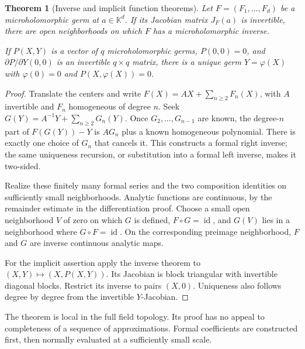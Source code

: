 \documentclass[11pt,letterpaper]{article}
\numberwithin{equation}{section}
\newtheorem{theorem}{Theorem}[section]
\theoremstyle{definition}
\theoremstyle{remark}
\newcommand{\K}{\mathbb K}
\DeclareMathOperator{\id}{id}
\begin{document}
\begin{theorem}[Inverse and implicit function theorems]\label{thm:inverse}
Let $F=(F_1,\ldots,F_d)$ be a microholomorphic germ at $a\in\K^d$.
If its Jacobian matrix $J_F(a)$ is invertible, there are open neighborhoods
on which $F$ has a microholomorphic inverse.

If $P(X,Y)$ is a vector of $q$ microholomorphic germs, $P(0,0)=0$, and
$\partial P/\partial Y(0,0)$ is an invertible $q\times q$ matrix, there
is a unique germ $Y=\varphi(X)$ with $\varphi(0)=0$ and
$P(X,\varphi(X))=0$.
\end{theorem}
\begin{proof}
Translate the centers and write $F(X)=AX+\sum_{n\ge2}F_n(X)$, with
$A$ invertible and $F_n$ homogeneous of degree $n$.
Seek $G(Y)=A^{-1}Y+\sum_{n\ge2}G_n(Y)$. Once $G_2,\ldots,G_{n-1}$
are known, the degree-$n$ part of $F(G(Y))-Y$ is $AG_n$ plus a known
homogeneous polynomial. There is exactly one choice of $G_n$ that cancels
it. This constructs a formal right inverse; the same uniqueness recursion,
or substitution into a formal left inverse, makes it two-sided.

Realize these finitely many formal series and the two composition
identities on sufficiently small neighborhoods. Analytic functions are
continuous, by the remainder estimate in the differentiation proof.
Choose a small open neighborhood $V$ of zero on which $G$ is defined,
$F\circ G=\id$, and $G(V)$ lies in a neighborhood where
$G\circ F=\id$. On the corresponding preimage neighborhood, $F$ and $G$
are inverse continuous analytic maps.

For the implicit assertion apply the inverse theorem to
$(X,Y)\mapsto(X,P(X,Y))$. Its Jacobian is block triangular with invertible
diagonal blocks. Restrict its inverse to pairs $(X,0)$. Uniqueness also
follows degree by degree from the invertible $Y$-Jacobian.
\end{proof}

The theorem is local in the full field topology. Its proof has no appeal
to completeness of a sequence of approximations. Formal coefficients are
constructed first, then normally evaluated at a sufficiently small scale.
\end{document}
